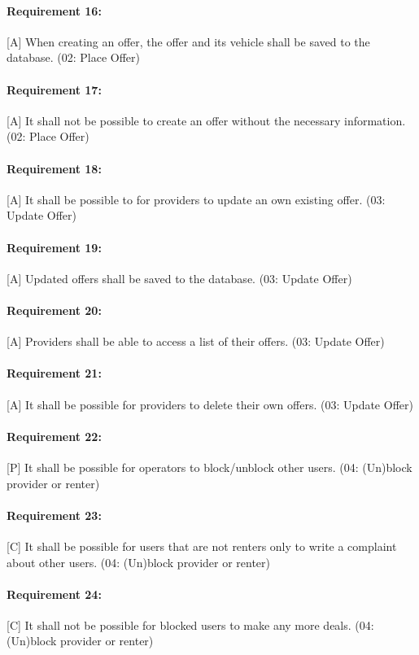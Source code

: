 \paragraph{Requirement 16:} [A] When creating an offer, the offer and its vehicle shall be saved to the database. (02: Place Offer)
\paragraph{Requirement 17:} [A] It shall not be possible to create an offer without the necessary information. (02: Place Offer)

\paragraph{Requirement 18:} [A] It shall be possible to for providers to update an own existing offer. (03: Update Offer)
\paragraph{Requirement 19:} [A] Updated offers shall be saved to the database. (03: Update Offer)
\paragraph{Requirement 20:} [A] Providers shall be able to access a list of their offers. (03: Update Offer)
\paragraph{Requirement 21:} [A] It shall be possible for providers to delete their own offers. (03: Update Offer)

\paragraph{Requirement 22:} [P] It shall be possible for operators to block/unblock other users. (04: (Un)block provider or renter)
\paragraph{Requirement 23:} [C] It shall be possible for users that are not renters only to write a complaint about other users. (04: (Un)block provider or renter)
\paragraph{Requirement 24:} [C] It shall not be possible for blocked users to make any more deals. (04: (Un)block provider or renter)

